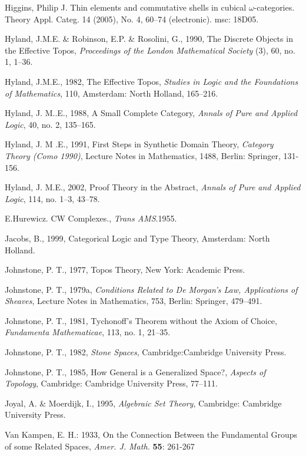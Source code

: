 \documentclass[12pt]{article}
\theoremstyle{plain}
\theoremstyle{definition}
\numberwithin{equation}{section}
\begin{document}
\begin{thebibliography}{199}
Higgins, Philip J. Thin elements and commutative shells in cubical $\omega$-categories. Theory Appl. Categ. 14 (2005), No. 4, 60--74 (electronic). msc: 18D05.

Hyland,  J.M.E. \& Robinson,  E.P. \& Rosolini, G., 1990, The Discrete Objects in the Effective Topos, 
{\em Proceedings of the London Mathematical Society} (3), 60, no. 1, 1--36. 

Hyland,  J.M.E., 1982, The Effective Topos, {\em Studies in Logic and the Foundations of Mathematics}, 110, Amsterdam: North Holland, 165--216.  

Hyland, J. M..E., 1988, A Small Complete Category, {\em Annals of Pure and Applied Logic}, 40, no. 2, 135--165. 

Hyland,  J. M .E., 1991, First Steps in Synthetic Domain Theory, {\em Category Theory (Como 1990)}, Lecture Notes in Mathematics, 1488, Berlin: Springer, 131-156.  

Hyland, J. M.E., 2002, Proof Theory in the Abstract, {\em Annals of Pure and Applied Logic}, 114, no. 1--3, 43--78. 

E.Hurewicz. CW Complexes., {\em Trans AMS}.1955.

Jacobs, B., 1999, Categorical Logic and Type Theory, Amsterdam: North Holland.  

Johnstone, P. T., 1977, Topos Theory, New York: Academic Press. 

Johnstone, P. T., 1979a, {\em Conditions Related to De Morgan's Law, Applications of Sheaves}, Lecture Notes in Mathematics, 753, Berlin: Springer, 479--491. 

Johnstone, P. T., 1981, Tychonoff's Theorem without the Axiom of Choice, 
{\em Fundamenta Mathematicae}, 113, no. 1, 21--35. 

Johnstone, P. T., 1982, {\em Stone Spaces}, Cambridge:Cambridge University Press.  

Johnstone, P. T., 1985, How General is a Generalized Space?, {\em Aspects of Topology}, Cambridge: Cambridge University Press, 77--111. 

Joyal, A. \& Moerdijk, I., 1995, {\em Algebraic Set Theory}, Cambridge: Cambridge University Press.  

Van Kampen, E. H.: 1933, On the Connection Between the Fundamental
Groups of some Related Spaces, \emph{Amer. J. Math.} \textbf{55}: 261-267


\end{thebibliography}
\end{document}
